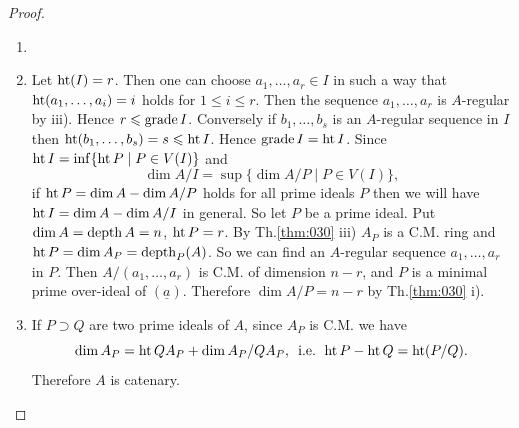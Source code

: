 \documentclass[../main]{subfiles}
\begin{document}
\begin{proof}\phantom{,}
\begin{enumerate}
    \item[iii)]
    \item[i)] Let $\operatorname{ht}(I)=r$. Then one can choose $a_1, \ldots, a_r \in I$ in such a way that $\operatorname{ht} (a_1, \dots, a_i)=i$ holds for $1 \leqslant i \leqslant r$. Then the sequence $a_1, \ldots, a_r$ is $A$-regular by iii). Hence $r \leqslant\operatorname{grade} I$. Conversely if $b_1, \ldots, b_s$ is an $A$-regular sequence in $I$ then $\operatorname{ht}(b_1, \dots, b_s)=s \leqslant \operatorname{ht} I$. Hence $\operatorname{grade} I= \operatorname{ht} I$. Since $\operatorname{ht} I=\inf\{\operatorname{ht} P \mid P \in V(I)\}$ and \[\dim A / I=\sup \{\dim A / P \mid P \in V(I)\},\] if $\operatorname{ht} P=\operatorname{dim} A-\operatorname{dim} A / P$ holds for all prime ideals $P$ then we will have $\operatorname{ht} I=\operatorname{dim} A-\operatorname{dim} A/I$ in general. So let $P$ be a prime ideal. Put $\operatorname{dim} A=\operatorname{depth} A=n$, $\operatorname{ht} P=r$. By Th.\ref{thm:030} iii) $A_P$ is a C.M. ring and $\operatorname{ht} P=\operatorname{dim} A_P=\operatorname{depth}_P(A)$. So we can find an $A$-regular sequence $a_1, \ldots, a_r$ in $P$. Then $A /(a_1, \ldots, a_r)$ is C.M. of dimension $n-r$, and $P$ is a minimal prime over-ideal of $(\underline{a})$. Therefore $\dim A / P=n-r$ by Th.\ref{thm:030} i).
    \item[ii)] If $P \supset Q$ are two prime ideals of $A$, since $A_P$ is C.M. we have \[\operatorname{dim} A_P=\operatorname{ht} QA_P+\operatorname{dim} A_P / Q A_P,\, \text{ i.e. } \operatorname{ht} P-\operatorname{ht} Q=\operatorname{ht}(P / Q).\] Therefore $A$ is catenary.
\end{enumerate}

\end{proof}
\end{document}
